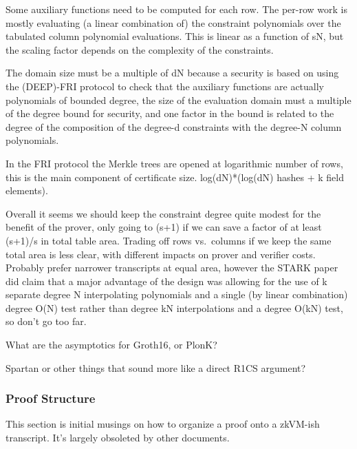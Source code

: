 \documentclass{article}
\theoremstyle{plain}
\theoremstyle{definition}
\begin{document}
Some auxiliary functions need to be computed for each row. The per-row
work is mostly evaluating (a linear combination of) the constraint
polynomials over the tabulated column polynomial evaluations. This is
linear as a function of sN, but the scaling factor depends on the
complexity of the constraints.

The domain size must be a multiple of dN because a security is based on
using the (DEEP)-FRI protocol to check that the auxiliary functions are
actually polynomials of bounded degree, the size of the evaluation
domain must a multiple of the degree bound for security, and one factor
in the bound is related to the degree of the composition of the degree-d
constraints with the degree-N column polynomials.

In the FRI protocol the Merkle trees are opened at logarithmic number of
rows, this is the main component of certificate size. log(dN)*(log(dN)
hashes + k field elements).

Overall it seems we should keep the constraint degree quite modest for
the benefit of the prover, only going to (s+1) if we can save a factor
of at least (s+1)/s in total table area. Trading off rows vs.~columns if
we keep the same total area is less clear, with different impacts on
prover and verifier costs. Probably prefer narrower transcripts at equal
area, however the STARK paper did claim that a major advantage of the
design was allowing for the use of k separate degree N interpolating
polynomials and a single (by linear combination) degree O(N) test rather
than degree kN interpolations and a degree O(kN) test, so don't go too
far.

What are the asymptotics for Groth16, or PlonK?

Spartan or other things that sound more like a direct R1CS argument?

\subsubsection{Proof Structure}\label{proof-structure}

This section is initial musings on how to organize a proof onto a
zkVM-ish transcript. It's largely obsoleted by other documents.
\end{document}
